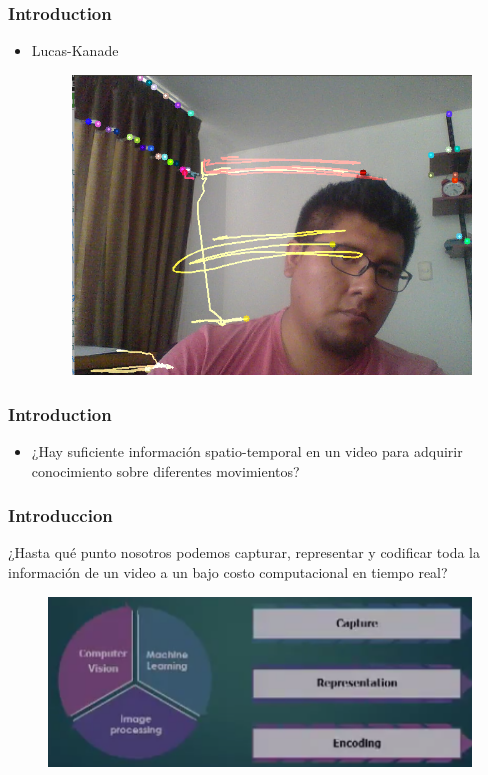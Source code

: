 \documentclass{beamer}
\begin{document}
\begin{frame}
\frametitle{Introduction}
\begin{itemize}
\item Lucas-Kanade 
\begin{figure}
\includegraphics[width=0.8\linewidth]{img2/Lucas-Kanade_method.png}
\end{figure}
\end{itemize}


\end{frame}




\begin{frame}
\frametitle{Introduction}
\begin{itemize}
\item ¿Hay suficiente información spatio-temporal en un video para adquirir conocimiento sobre diferentes movimientos?
\end{itemize}

\end{frame}


\begin{frame}
\frametitle{Introduccion}
¿Hasta qué punto nosotros podemos capturar, representar y codificar toda la información de un video a un bajo costo computacional en tiempo real?


\begin{figure}
\includegraphics[width=0.8\linewidth]{img2/Selection_016.png}
\end{figure}

\end{frame}
\end{document}
